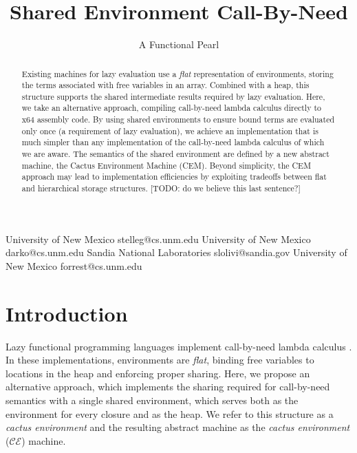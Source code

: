 \documentclass[preprint]{sigplanconf}
\begin{document}
\title{Shared Environment Call-By-Need}
\subtitle{A Functional Pearl}

           {University of New Mexico}
           {stelleg@cs.unm.edu}
           {University of New Mexico}
           {darko@cs.unm.edu}
           {Sandia National Laboratories}
           {slolivi@sandia.gov}
           {University of New Mexico}
           {forrest@cs.unm.edu}

\maketitle

\begin{abstract}
  Existing machines for lazy evaluation use a \emph{flat}
  representation of environments, storing the terms associated with
  free variables in an array.  Combined with a heap, this structure
  supports the shared intermediate results required by lazy
  evaluation.  Here, we take an alternative approach, compiling
  call-by-need lambda calculus directly to x64 assembly code.  By
  using shared environments to ensure bound terms are evaluated only
  once (a requirement of lazy evaluation), we achieve an
  implementation that is much simpler than any implementation of the
  call-by-need lambda calculus of which we are aware.  The semantics
  of the shared environment are defined by a new abstract machine, the Cactus
Environment Machine (CEM).  Beyond simplicity, the CEM approach
may lead to implementation efficiencies by exploiting tradeoffs
between flat and hierarchical storage structures.  [TODO: do we
believe this last sentence?]

\end{abstract}

\section{Introduction} \label{sec:intro}

Lazy functional programming languages implement call-by-need lambda calculus
\cite{ariola1995call}. In these implementations, environments are
\emph{flat}, binding free variables to locations in the heap and
enforcing proper sharing.  
Here, we propose an alternative approach, which
implements the
sharing required for call-by-need semantics with a single
shared environment, which serves both as the environment for every
closure and as the heap. We refer to this structure as a \emph{cactus
  environment} and the resulting abstract machine as the \emph{cactus
  environment} ($\mathcal{CE}$) machine.
\end{document}
